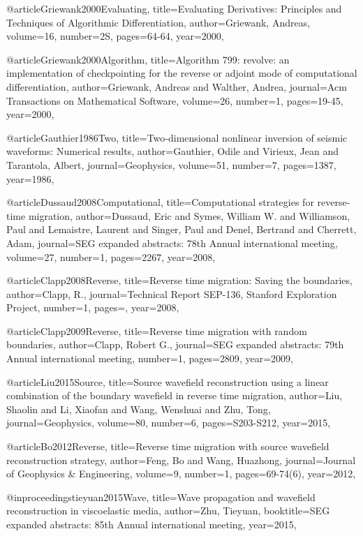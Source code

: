 {@article{Griewank2000Evaluating,
  title={Evaluating Derivatives: Principles and Techniques of Algorithmic Differentiation},
  author={Griewank, Andreas},
  volume={16},
  number={2S},
  pages={64-64},
  year={2000},
}

@article{Griewank2000Algorithm,
  title={Algorithm 799: revolve: an implementation of checkpointing for the reverse or adjoint mode of computational differentiation},
  author={Griewank, Andreas and Walther, Andrea},
  journal={Acm Transactions on Mathematical Software},
  volume={26},
  number={1},
  pages={19-45},
  year={2000},
}

@article{Gauthier1986Two,
  title={Two‐dimensional nonlinear inversion of seismic waveforms: Numerical results},
  author={Gauthier, Odile and Virieux, Jean and Tarantola, Albert},
  journal={Geophysics},
  volume={51},
  number={7},
  pages={1387},
  year={1986},
}

@article{Dussaud2008Computational,
  title={Computational strategies for reverse-time migration},
  author={Dussaud, Eric and Symes, William W. and Williamson, Paul and Lemaistre, Laurent and Singer, Paul and Denel, Bertrand and Cherrett, Adam},
  journal={SEG expanded abstracts: 78th Annual international meeting},
  volume={27},
  number={1},
  pages={2267},
  year={2008},
}

@article{Clapp2008Reverse,
  title={Reverse time migration: Saving the boundaries},
  author={Clapp, R.},
  journal={Technical Report SEP-136, Stanford Exploration Project},
  number={1},
  pages={},
  year={2008},
}

@article{Clapp2009Reverse,
  title={Reverse time migration with random boundaries},
  author={Clapp, Robert G.},
  journal={SEG expanded abstracts: 79th Annual international meeting},
  number={1},
  pages={2809},
  year={2009},
}

@article{Liu2015Source,
  title={Source wavefield reconstruction using a linear combination of the boundary wavefield in reverse time migration},
  author={Liu, Shaolin and Li, Xiaofan and Wang, Wenshuai and Zhu, Tong},
  journal={Geophysics},
  volume={80},
  number={6},
  pages={S203-S212},
  year={2015},
}

@article{Bo2012Reverse,
  title={Reverse time migration with source wavefield reconstruction strategy},
  author={Feng, Bo and Wang, Huazhong},
  journal={Journal of Geophysics \& Engineering},
  volume={9},
  number={1},
  pages={69-74(6)},
  year={2012},
}

@inproceedings{tieyuan2015Wave,
  title={Wave propagation and wavefield reconstruction in viscoelastic media},
  author={Zhu, Tieyuan},
  booktitle={SEG expanded abstracts: 85th Annual international meeting},
  year={2015},
}

}
